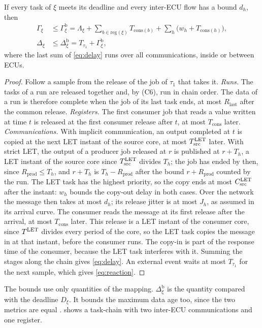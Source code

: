 \begin{proposition}
\label{prop:e2e}
If every task of $\xi$ meets its deadline and every inter-ECU flow has a
bound $d_h$, then
\begin{align}
\Gamma_\xi&\le\Gamma^{\mathrm{b}}_\xi=\Lambda_\xi
	+\sum_{b\in\mathrm{reg}(\xi)}T_{\mathrm{cons}(b)}
	+\sum_{h}\bigl(w_h+T_{\mathrm{cons}(h)}\bigr),\label{eq:delay}\\
\Delta_\xi&\le\Delta^{\mathrm{b}}_\xi=T_{\tau_1}+\Gamma^{\mathrm{b}}_\xi,
	\label{eq:reaction}
\end{align}
where the last sum of \cref{eq:delay} runs over all communications,
inside or between ECUs.
\end{proposition}
\begin{proof}
Follow a sample from the release of the job of $\tau_1$ that takes it.
\emph{Runs.} The tasks of a run are released together and, by (C6), run
in chain order. The data of a run is therefore complete when the job of its
last task ends, at most $R_{\mathrm{last}}$ after the common release.
\emph{Registers.} The first consumer job that reads a value written at
time $t$ is released at the first consumer release after $t$, at most
$T_{\mathrm{cons}}$ later. \emph{Communications.} With implicit
communication, an output completed at $t$ is copied at the next LET instant
of the source core, at most $T^{\mathrm{LET}}_{\mathrm{src}}$ later. With strict
LET, the output of a producer job released at $r$ is published at
$r+T_h$, a LET instant of the source core since $T^{\mathrm{LET}}_{\mathrm{src}}$
divides $T_h$; the job has ended by then, since $R_{\mathrm{prod}}\le T_h$,
and $r+T_h$ is $T_h-R_{\mathrm{prod}}$ after the bound $r+R_{\mathrm{prod}}$
counted by the run. The LET task has the highest priority, so the copy
ends at most $C^{\mathrm{LET}}_{\mathrm{src}}$ after the instant: $w_h$ bounds the
copy-out delay in both cases. Over the network
the message then takes at most $d_h$; its release jitter is at most
$J_h$, as assumed in its arrival curve. The consumer reads the message at
its first release after the arrival, at most $T_{\mathrm{cons}}$ later.
This release is a LET instant of the consumer core, since $T^{\mathrm{LET}}$
divides every period of the core, so the LET task copies the message in
at that instant, before the consumer runs. The copy-in is part of the
response time of the consumer, because the LET task interferes with it.
Summing the stages along the chain gives \cref{eq:delay}. An external
event waits at most $T_{\tau_1}$ for the next sample, which gives
\cref{eq:reaction}.
\end{proof}
The bounds use only quantities of the mapping. $\Delta^{\mathrm b}_\xi$
is the quantity compared with the deadline $D_\xi$. It bounds the maximum data age
too, since the two metrics are equal \cite{gunzel2023equivalence}.
 shows a task-chain with two inter-ECU communications and
one register.

